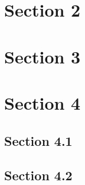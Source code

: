\section{Section 2}
\lipsum[2-4]
\section{Section 3}
\lipsum[2-4]
\section{Section 4}
\lipsum[2-4]
\subsection{Section 4.1}
\lipsum[2-4]
\subsection{Section 4.2}